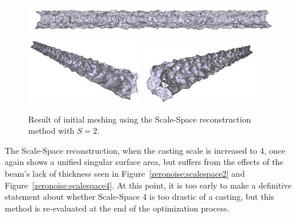 \documentclass[12pt]{drexelthesis}
\begin{document}
\begin{figure}[!ht] 
	\centering
		\includegraphics[width=5in]{simulated-lab-scan/2cmnoise/2cmmeshNeat/scalespace200.png}
		\includegraphics[width=2in]{simulated-lab-scan/2cmnoise/2cmmeshNeat/scalespace201.png}
		\includegraphics[width=2in]{simulated-lab-scan/2cmnoise/2cmmeshNeat/scalespace202.png}
		\caption[Initial meshing using a Scale-Space reconstruction with $S = 2$]{\centering  Result of initial meshing using the Scale-Space reconstruction method with $S = 2$.}
		\label{2cmnoise:scalepspace2}
\end{figure}

The Scale-Space reconstruction, when the casting scale is increased to 4, once again shows a unified singular surface area, but suffers from the effects of the beam's lack of thickness seen in Figure~\ref{zeronoise:scalespace2} and Figure~\ref{zeronoise:scalespace4}. At this point, it is too early to make a definitive statement about whether Scale-Space 4 is too drastic of a casting, but this method is re-evaluated  at the end of the optimization process.
\end{document}
